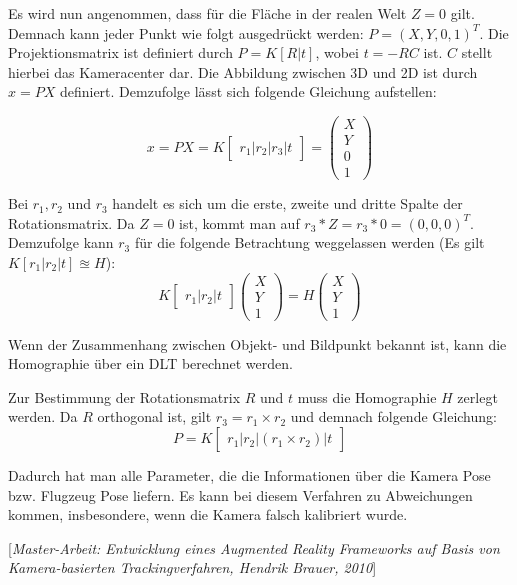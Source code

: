 \documentclass{ezb}
\begin{document}
Es wird nun angenommen, dass für die Fläche in der realen Welt $Z=0$ gilt. Demnach kann jeder Punkt wie folgt ausgedrückt werden: $P=(X, Y, 0, 1)^T$.
Die Projektionsmatrix ist definiert durch $P=K[R|t]$, wobei $t=-RC$ ist. $C$ stellt hierbei das Kameracenter dar. Die Abbildung zwischen 3D und 2D ist durch $x=PX$ definiert. Demzufolge lässt sich folgende Gleichung aufstellen:

\begin{equation}
x=PX=K
\begin{bmatrix}
r_{1} | r_{2} | r_{3} | t 
\end{bmatrix}
=
\begin{pmatrix}
X \\
Y \\
0 \\
1
\end{pmatrix}
\end{equation} 

Bei $r_{1}, r_{2}$ und $r_{3}$ handelt es sich um die erste, zweite und dritte Spalte der Rotationsmatrix. Da $Z=0$ ist, kommt man auf $r_{3} * Z = r_{3} * 0 = (0,0,0)^T$. Demzufolge kann $r_{3}$ für die folgende Betrachtung weggelassen werden (Es gilt $K[r_{1}|r_{2}|t] \approxeq H$):
\begin{equation}
K
\begin{bmatrix}
r_{1} | r_{2} | t 
\end{bmatrix}
\begin{pmatrix}
X \\
Y \\
1
\end{pmatrix}
=H
\begin{pmatrix}
X \\
Y \\
1
\end{pmatrix}
\end{equation} 

Wenn der Zusammenhang zwischen Objekt- und Bildpunkt bekannt ist, kann die Homographie über ein DLT berechnet werden. 

Zur Bestimmung der Rotationsmatrix $R$ und $t$ muss die Homographie $H$ zerlegt werden. Da $R$ orthogonal ist, gilt $r_3 = r_1 \times r_2$ und demnach folgende Gleichung:
\begin{equation}
P=K
\begin{bmatrix}
r_{1} | r_{2} | (r_1 \times r_2)| t 
\end{bmatrix}
\end{equation} 

Dadurch hat man alle Parameter, die die Informationen über die Kamera Pose bzw. Flugzeug Pose liefern. Es kann bei diesem Verfahren zu Abweichungen kommen, insbesondere, wenn die Kamera falsch kalibriert wurde.

[\textit{Master-Arbeit: Entwicklung eines Augmented Reality
Frameworks auf Basis von Kamera-basierten
Trackingverfahren, Hendrik Brauer, 2010}]


\end{document}
